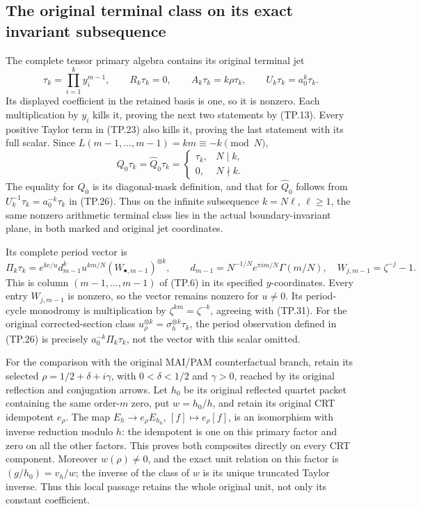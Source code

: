 \subsection{The original terminal class on its exact invariant subsequence}

The complete tensor primary algebra contains its original terminal
jet
\[
 \tau_k=\prod_{i=1}^k y_i^{m-1},\qquad
 R_k\tau_k=0,\qquad A_k\tau_k=k\rho\tau_k,\qquad
 U_k\tau_k=a_0^k\tau_k.
 \tag{TP.30}\label{CFStage:eq:tp-terminal}
\]
Its displayed coefficient in the retained basis is one, so it is
nonzero. Each multiplication by \(y_i\) kills it, proving the next
two statements by (TP.13). Every positive Taylor term in (TP.23)
also kills it, proving the last statement with its full scalar.
Since \(L(m-1,\ldots,m-1)=km\equiv-k\pmod N\),
\[
 Q_0\tau_k=\widehat Q_0\tau_k
   =\begin{cases}\tau_k,&N\mid k,\\0,&N\nmid k.\end{cases}
 \tag{TP.31}\label{CFStage:eq:tp-terminalprojector}
\]
The equality for \(Q_0\) is its diagonal-mask definition, and
that for \(\widehat Q_0\) follows from
\(U_k^{-1}\tau_k=a_0^{-k}\tau_k\) in (TP.26).
Thus on the infinite subsequence \(k=N\ell\), \(\ell\geq1\),
the same nonzero arithmetic terminal class lies in the actual
boundary-invariant plane, in both marked and original jet coordinates.

Its complete period vector is
\[
 \Pi_k\tau_k=e^{kc/u}d_{m-1}^k u^{km/N}
       (W_{\bullet,m-1})^{\otimes k},\qquad
 d_{m-1}=N^{-1/N}e^{\pi i m/N}\Gamma(m/N),\quad
 W_{j,m-1}=\zeta^{-j}-1.
 \tag{TP.32}\label{CFStage:eq:tp-terminalperiod}
\]
This is column \((m-1,\ldots,m-1)\) of (TP.6) in its
specified \(y\)-coordinates. Every entry \(W_{j,m-1}\)
is nonzero, so the vector remains nonzero for \(u\ne0\).
Its period-cycle monodromy is multiplication by
\(\zeta^{km}=\zeta^{-k}\), agreeing with (TP.31).
For the original corrected-section class
\(u_\rho^{\otimes k}=\sigma_h^{\otimes k}\tau_k\), the
period observation defined in (TP.26) is precisely
\(a_0^{-k}\Pi_k\tau_k\), not the vector with this scalar omitted.

For the comparison with the original MAI/PAM counterfactual branch,
retain its selected \(\rho=1/2+\delta+i\gamma\), with
\(0<\delta<1/2\) and \(\gamma>0\), reached by its original
reflection and conjugation arrows. Let \(h_0\) be its original
reflected quartet packet containing the same order-\(m\) zero, put
\(w=h_0/h\), and retain its original CRT idempotent \(e_\rho\).
The map \(E_h\to e_\rho E_{h_0}\), \([f]\mapsto e_\rho[f]\),
is an isomorphism with inverse reduction modulo \(h\):
the idempotent is one on this primary factor and zero on all
the other factors. This proves both composites directly on
every CRT component. Moreover \(w(\rho)\ne0\), and the exact
unit relation on this factor is
\((g/h_0)=v_h/w\); the inverse of the class of \(w\) is its
unique truncated Taylor inverse. Thus this local passage retains
the whole original unit, not only its constant coefficient.

